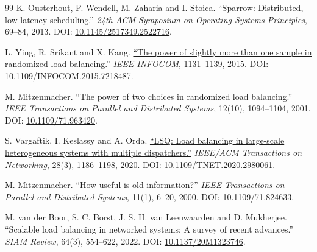 \documentclass[12pt,a4paper]{article}
\begin{document}
\begin{thebibliography}{99}
 K. Ousterhout, P. Wendell, M. Zaharia and I. Stoica. \href{\detokenize{https://sigops.org/s/conferences/sosp/2013/papers/p69-ousterhout.pdf}}{``Sparrow: Distributed, low latency scheduling.''} \emph{24th ACM Symposium on Operating Systems Principles}, 69--84, 2013. DOI: \href{\detokenize{https://doi.org/10.1145/2517349.2522716}}{10.1145/2517349.2522716}.

 L. Ying, R. Srikant and X. Kang. \href{\detokenize{https://bpb-us-w2.wpmucdn.com/sites.coecis.cornell.edu/dist/9/287/files/2019/08/Srikant-1-YinSriKan14tech.pdf}}{``The power of slightly more than one sample in randomized load balancing.''} \emph{IEEE INFOCOM}, 1131--1139, 2015. DOI: \href{\detokenize{https://doi.org/10.1109/INFOCOM.2015.7218487}}{10.1109/INFOCOM.2015.7218487}.

 M. Mitzenmacher. ``The power of two choices in randomized load balancing.'' \emph{IEEE Transactions on Parallel and Distributed Systems}, 12(10), 1094--1104, 2001. DOI: \href{\detokenize{https://doi.org/10.1109/71.963420}}{10.1109/71.963420}.

 S. Vargaftik, I. Keslassy and A. Orda. \href{\detokenize{https://webee.technion.ac.il/~isaac/p/ton20_lsq.pdf}}{``LSQ: Load balancing in large-scale heterogeneous systems with multiple dispatchers.''} \emph{IEEE/ACM Transactions on Networking}, 28(3), 1186--1198, 2020. DOI: \href{\detokenize{https://doi.org/10.1109/TNET.2020.2980061}}{10.1109/TNET.2020.2980061}.

 M. Mitzenmacher. \href{\detokenize{https://www.eecs.harvard.edu/~michaelm/NEWWORK/postscripts/oldinfo-jver-submit.pdf}}{``How useful is old information?''} \emph{IEEE Transactions on Parallel and Distributed Systems}, 11(1), 6--20, 2000. DOI: \href{\detokenize{https://doi.org/10.1109/71.824633}}{10.1109/71.824633}.

 M. van der Boor, S. C. Borst, J. S. H. van Leeuwaarden and D. Mukherjee. ``Scalable load balancing in networked systems: A survey of recent advances.'' \emph{SIAM Review}, 64(3), 554--622, 2022. DOI: \href{\detokenize{https://doi.org/10.1137/20M1323746}}{10.1137/20M1323746}.


\end{thebibliography}
\end{document}
